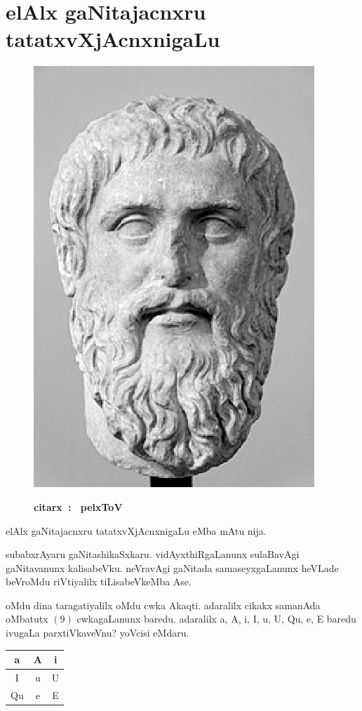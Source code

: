 \chapter{elAlx gaNitajacnxru tatatxvXjAcnxnigaLu}

\begin{figure}
  \centering\includegraphics[scale=0.8]{src/figures/Plato.eps}
  
  {\bf  citarx~:~ pelxToV}
    \end{figure}
elAlx gaNitajacnxru tatatxvXjAcnxnigaLu eMba mAtu nija.

subabxrAyaru gaNitashikaSxkaru. vidAyxthiRgaLanunx sulaBavAgi gaNitavanunx kalisabeVku. neVravAgi gaNitada samaseyxgaLanunx heVLade beVroMdu riVtiyalilx tiLisabeVkeMba Ase.

oMdu dina taragatiyalilx oMdu cwka Akaqti. adaralilx cikakx samanAda oMbatutx $(9)$ cwkagaLanunx baredu. adaralilx a, A, i, I, u, U, Qu, e, E baredu ivugaLa parxtiVkaveVnu? yoVcisi eMdaru.
\begin{center}
\begin{tabular}{|c|c|c|}
\hline
a & A & i\\
\hline
I & u & U\\
\hline
Qu & e & E\\
\hline
\end{tabular}
\end{center}

